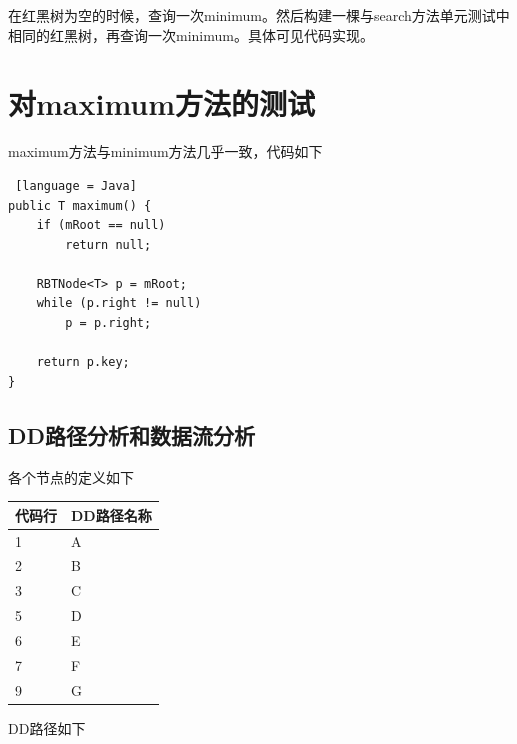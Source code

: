 \documentclass[12pt, a4paper, oneside]{ctexart}
\begin{document}
在红黑树为空的时候，查询一次minimum。然后构建一棵与search方法单元测试中相同的红黑树，再查询一次minimum。具体可见代码实现。

\section{对maximum方法的测试}

maximum方法与minimum方法几乎一致，代码如下

\begin{lstlisting} [language = Java]
public T maximum() {
    if (mRoot == null)
        return null;

    RBTNode<T> p = mRoot;
    while (p.right != null)
        p = p.right;

    return p.key;
}
\end{lstlisting}

\subsection{DD路径分析和数据流分析}

各个节点的定义如下

\begin{table}[!h]
    \begin{tabular}{|l|l|}
    \hline
    代码行 & DD路径名称\\ \hline
    1 & A\\ \hline
    2 & B\\ \hline
    3 & C \\ \hline
    5 & D \\ \hline
    6 & E \\ \hline
    7 & F \\ \hline
    9 & G \\ \hline
    \end{tabular}
\end{table}

DD路径如下
\end{document}

